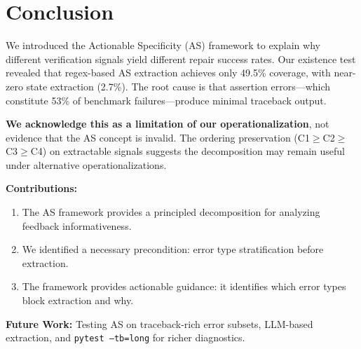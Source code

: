 \section{Conclusion}

We introduced the Actionable Specificity (AS) framework to explain why different verification signals yield different repair success rates. Our existence test revealed that regex-based AS extraction achieves only 49.5\% coverage, with near-zero state extraction (2.7\%). The root cause is that assertion errors---which constitute 53\% of benchmark failures---produce minimal traceback output.

\textbf{We acknowledge this as a limitation of our operationalization}, not evidence that the AS concept is invalid. The ordering preservation (C1$\geq$C2$\geq$C3$\geq$C4) on extractable signals suggests the decomposition may remain useful under alternative operationalizations.

\textbf{Contributions:}
\begin{enumerate}
    \item The AS framework provides a principled decomposition for analyzing feedback informativeness.
    \item We identified a necessary precondition: error type stratification before extraction.
    \item The framework provides actionable guidance: it identifies which error types block extraction and why.
\end{enumerate}

\textbf{Future Work:} Testing AS on traceback-rich error subsets, LLM-based extraction, and \texttt{pytest --tb=long} for richer diagnostics.
